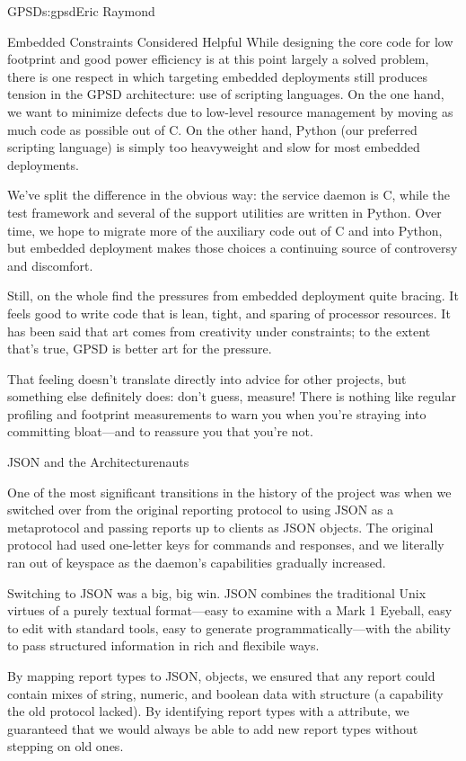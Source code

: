 \begin{aosachapter}{GPSD}{s:gpsd}{Eric Raymond}
\begin{aosasect1}{Embedded Constraints Considered Helpful}
While designing the core code for low footprint and good power
efficiency is at this point largely a solved problem, there is one
respect in which targeting embedded deployments still produces tension
in the GPSD architecture: use of scripting languages. On the one hand,
we want to minimize defects due to low-level resource management by
moving as much code as possible out of C.  On the other hand, Python
(our preferred scripting language) is simply too heavyweight and slow
for most embedded deployments.

We've split the difference in the obvious way: the  service
daemon is C, while the test framework and several of the support
utilities are written in Python. Over time, we hope to migrate more of
the auxiliary code out of C and into Python, but embedded deployment
makes those choices a continuing source of controversy and discomfort.

Still, on the whole find the pressures from embedded deployment quite
bracing.  It feels good to write code that is lean, tight, and sparing
of processor resources.  It has been said that art comes from
creativity under constraints; to the extent that's true, GPSD is
better art for the pressure.

That feeling doesn't translate directly into advice for other
projects, but something else definitely does: don't guess, measure!
There is nothing like regular profiling and footprint measurements to
warn you when you're straying into committing bloat---and to reassure
you that you're not.

\end{aosasect1}

\begin{aosasect1}{JSON and the Architecturenauts}

One of the most significant transitions in the history of the project
was when we switched over from the original reporting protocol to
using JSON as a metaprotocol and passing reports up to clients as JSON
objects. The original protocol had used one-letter keys for commands
and responses, and we literally ran out of keyspace as the daemon's
capabilities gradually increased.

Switching to JSON was a big, big win. JSON combines the traditional
Unix virtues of a purely textual format---easy to examine with a Mark
1 Eyeball, easy to edit with standard tools, easy to generate
programmatically---with the ability to pass structured information in
rich and flexibile ways.

By mapping report types to JSON, objects, we ensured that any report
could contain mixes of string, numeric, and boolean data with
structure (a capability the old protocol lacked).  By identifying
report types with a  attribute, we guaranteed that we
would always be able to add new report types without stepping on old
ones.


\end{aosasect1}
\end{aosachapter}
